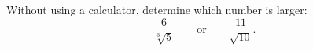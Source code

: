 Without using a calculator, determine which number is larger:
\[\dfrac{6}{\sqrt[3]5}\qquad\text{or}\qquad\dfrac{11}{\sqrt{10}}.\]
